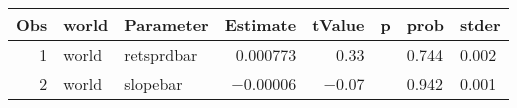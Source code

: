 

\begin{longtable}{|r|l|l|r|r|l|l|l|}\hline
   Obs &    world &    Parameter &    Estimate &    tValue &    p &    prob &    stder\\\hline
\endhead
   1 &    world &    retsprdbar &    0.000773 &    0.33 &      &    0.744 &    0.002\\\hline
   2 &    world &    slopebar &    $-$0.00006 &    $-$0.07 &      &    0.942 &    0.001\\\hline
\end{longtable}

